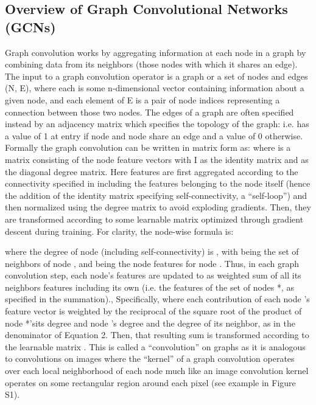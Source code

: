 \subsection{Overview of Graph Convolutional Networks (GCNs)}
Graph convolution \cite{kipfSemiSupervisedClassificationGraph2017} works by aggregating information at each node in a graph by combining data from its neighbors (those nodes with which it shares an edge). The input to a graph convolution operator is a graph or a set of nodes and edges (N, E), where each   is some n-dimensional vector containing information about a given node, and each element of E is a pair of node indices representing a connection between those two nodes. The edges of a graph are often specified instead by an adjacency matrix   which specifies the topology of the graph: i.e.   has a value of 1 at entry   if node   and node   share an edge and a value of 0 otherwise. Formally the graph convolution can be written in matrix form as:
where   is a matrix consisting of the   node feature vectors   with I as the identity matrix and   as the diagonal degree matrix. Here features are first aggregated according to the connectivity specified in   including the features belonging to the node itself (hence the addition of the identity matrix specifying self-connectivity, a “self-loop”) and then normalized using the degree matrix to avoid exploding gradients. Then, they are transformed according to some learnable matrix   optimized through gradient descent during training. For clarity, the node-wise formula is: 

where the degree of node (including self-connectivity)   is   , with   being the set of neighbors of node  , and   being the node features for node  .   Thus, in each graph convolution step, each node’s features are updated to as weighted sum of all its neighbors features including its own (i.e. the features of the set of nodes *, as specified in the summation)., Specifically, where each contribution of each node  ’s feature vector is weighted by the reciprocal of the square root of the product of node *’sits degree and node  ’s degree and the degree of its neighbor, as in the denominator of Equation 2.  Then, that resulting sum is transformed according to the learnable matrix  .  This is called a “convolution” on graphs as it is analogous to convolutions on images where the “kernel” of a graph convolution operates over each local neighborhood of each node much like an image convolution kernel operates on some rectangular region around each pixel (see example in Figure S1). 

